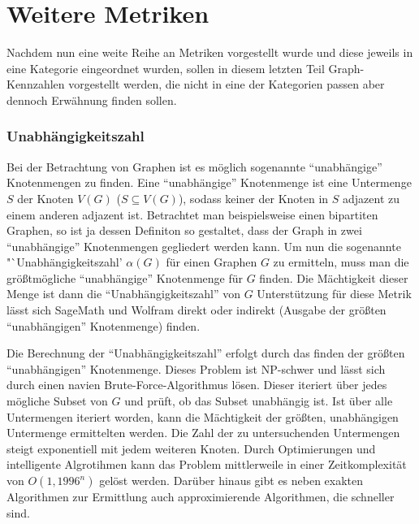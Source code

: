 \documentclass[a4paper,12pt,ngerman,chapterprefix=false,listof=totoc,bibliography=totoc]{scrreprt}
\begin{document}
\section{Weitere Metriken}
{
Nachdem nun eine weite Reihe an Metriken vorgestellt wurde und diese jeweils in eine Kategorie eingeordnet wurden, sollen in diesem letzten Teil Graph-Kennzahlen vorgestellt werden, die nicht in eine der Kategorien passen aber dennoch Erwähnung finden sollen.
\subsubsection*{Unabhängigkeitszahl}
{
Bei der Betrachtung von Graphen ist es möglich sogenannte "`unabhängige"' Knotenmengen zu finden. Eine "`unabhängige"' Knotenmenge ist eine Untermenge \(S\) der Knoten \(V(G)\) (\(S\subseteq V(G)\)), sodass keiner der Knoten in \(S\) adjazent zu einem anderen adjazent ist. Betrachtet man beispielsweise einen bipartiten Graphen, so ist ja dessen Definiton so gestaltet, dass der Graph in zwei "`unabhängige"' Knotenmengen gegliedert werden kann. Um nun die sogenannte "`Unabhängigkeitszahl' \(\alpha(G)\) für einen Graphen \(G\) zu ermitteln, muss man die größtmögliche "`unabhängige"' Knotenmenge für \(G\) finden. Die Mächtigkeit dieser Menge ist dann die "`Unabhängigkeitszahl"' von \(G\) \cite{diestel_graphentheorie_2000,weisstein_maximum_nodate,weisstein_maximum_nodate} Unterstützung für diese Metrik lässt sich SageMath und Wolfram direkt oder indirekt (Ausgabe der größten "`unabhängigen"' Knotenmenge) finden. \cite{sagemath_graph_2020,weisstein_independence_nodate}

Die Berechnung der "`Unabhängigkeitszahl"' erfolgt durch das finden der größten "`unabhängigen"' Knotenmenge. Dieses Problem ist NP-schwer und lässt sich durch einen navien Brute-Force-Algorithmus lösen. Dieser iteriert über jedes mögliche Subset von \(G\) und prüft, ob das Subset unabhängig ist. Ist über alle Untermengen iteriert worden, kann die Mächtigkeit der größten, unabhängigen Untermenge ermittelten werden. Die Zahl der zu untersuchenden Untermengen steigt exponentiell mit jedem weiteren Knoten. Durch Optimierungen und intelligente Algrotihmen kann das Problem mittlerweile in einer Zeitkomplexität von \(O(1,1996^n)\) gelöst werden. Darüber hinaus gibt es neben exakten Algorithmen zur Ermittlung auch approximierende Algorithmen, die schneller sind. \cite{xiao_exact_2017}
}
}
\end{document}

